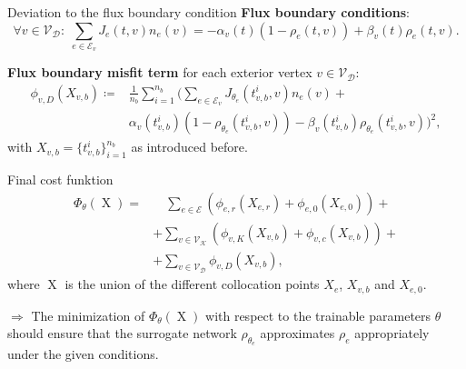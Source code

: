 \documentclass[9pt]{beamer}
\begin{document}
\begin{frame}{Deviation to the flux boundary condition}
    \textbf{Flux boundary conditions}:
    \begin{equation*}
        \forall v \in \mathcal{V}_\mathcal{D} \colon \; \sum_{e\in \mathcal{E}_v}J_e \left( t, v \right)  n_e  \left( v \right) =-\alpha_v \left( t \right)   \left( 1-\rho_e \left(t, v \right) \right)  + \beta_v \left( t \right)  \rho_e \left(t, v \right).
    \end{equation*}

    \vspace{3mm}

    \textbf{Flux boundary misfit term} for each exterior vertex $v \in \mathcal{V}_{\mathcal{D}}$:
    \begin{equation*}
        \begin{aligned} 
            \phi_{v,D}  \left( X_{v,b} \right) \coloneqq & \frac{1}{n_b} \sum_{i=1}^{n_b} \bigg( \sum_{e \in \mathcal{E}_v} J_{\theta_e}\left( t_{v,b}^i, v \right) n_e  \left( v \right) + \\
            & \alpha_v \left( t_{v,b}^i \right)  \left( 1- \rho_{\theta_e}  \left( t_{v,b}^i, v \right) \right) - \beta_v \left( t_{v,b}^i \right) \rho_{\theta_e}  \left( t_{v,b}^i, v \right) \bigg)^2,
        \end{aligned}
    \end{equation*}
    with $X_{v,b} = \{t_{v,b}^i\}_{i=1}^{n_b}$ as introduced before.
\end{frame}



\begin{frame}{Final cost funktion}
    \begin{equation*}
        \begin{aligned} 
            \Phi_{\theta} \left( \operatorname{X} \right)  = & \quad \sum_{e \in \mathcal{E}}  \left(  \phi_{e,r}  \left( X_{e,r} \right) + \phi_{e,0}  \left( X_{e,0} \right)  \right) + \\
            & + \sum_{v \in \mathcal{V}_\mathcal{K}}  \left(  \phi_{v,K}  \left( X_{v,b} \right) + \phi_{v,c} \left( X_{v,b} \right)  \right) + \\
            & + \sum_{v \in \mathcal{V}_\mathcal{D}} \phi_{v,D} \left( X_{v,b} \right),
        \end{aligned}
    \end{equation*}
    where $\operatorname{X}$ is the union of the different collocation points $X_e$, $X_{v,b}$ and $X_{e,0}$. \\

    \vspace{5mm}

    $\Rightarrow$ The minimization of $\Phi_{\theta} \left( \operatorname{X} \right)$ with respect to the trainable parameters $\theta$ should ensure that the surrogate network $\rho_{\theta_e}$ approximates $\rho_{e}$ appropriately under the given conditions. 
\end{frame}
\end{document}
